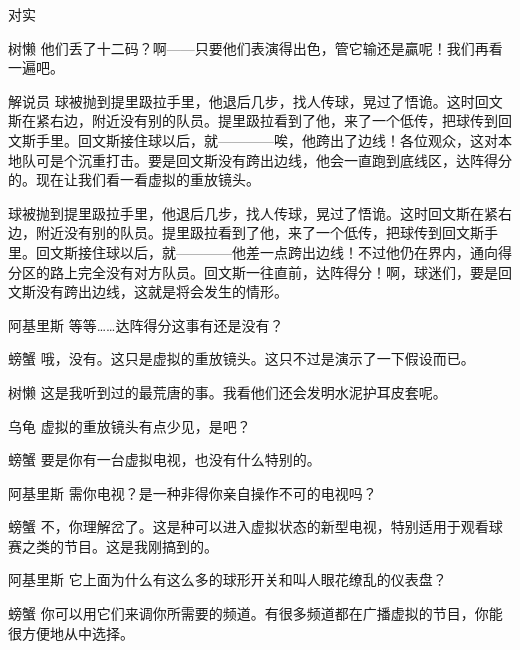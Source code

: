 \begin{dialog}{对实}
\begin{dialogue}
\item[树懒]他们丢了十二码？啊——只要他们表演得出色，管它输还是贏呢！我们再看一遍吧。


\item[解说员]球被抛到提里趿拉手里，他退后几步，找人传球，晃过了悟诡。这时回文斯在紧右边，附近没有别的队员。提里趿拉看到了他，来了一个低传，把球传到回文斯手里。回文斯接住球以后，就————唉，他跨出了边线！各位观众，这对本地队可是个沉重打击。要是回文斯没有跨出边线，他会一直跑到底线区，达阵得分的。现在让我们看一看虚拟的重放镜头。


球被抛到提里趿拉手里，他退后几步，找人传球，晃过了悟诡。这时回文斯在紧右边，附近没有别的队员。提里趿拉看到了他，来了一个低传，把球传到回文斯手里。回文斯接住球以后，就————他差一点跨出边线！不过他仍在界内，通向得分区的路上完全没有对方队员。回文斯一往直前，达阵得分！啊，球迷们，要是回文斯没有跨出边线，这就是将会发生的情形。

\item[阿基里斯]等等……达阵得分这事有还是没有？

\item[螃蟹]哦，没有。这只是虚拟的重放镜头。这只不过是演示了一下假设而已。

\item[树懒]这是我听到过的最荒唐的事。我看他们还会发明水泥护耳皮套呢。

\item[乌龟]虚拟的重放镜头有点少见，是吧？

\item[螃蟹]要是你有一台虚拟电视，也没有什么特别的。

\item[阿基里斯]需你电视？是一种非得你亲自操作不可的电视吗？

\item[螃蟹]不，你理解岔了。这是种可以进入虚拟状态的新型电视，特别适用于观看球赛之类的节目。这是我刚搞到的。

\item[阿基里斯]它上面为什么有这么多的球形开关和叫人眼花缭乱的仪表盘？

\item[螃蟹]你可以用它们来调你所需要的频道。有很多频道都在广播虚拟的节目，你能很方便地从中选择。


\end{dialogue}
\end{dialog}
